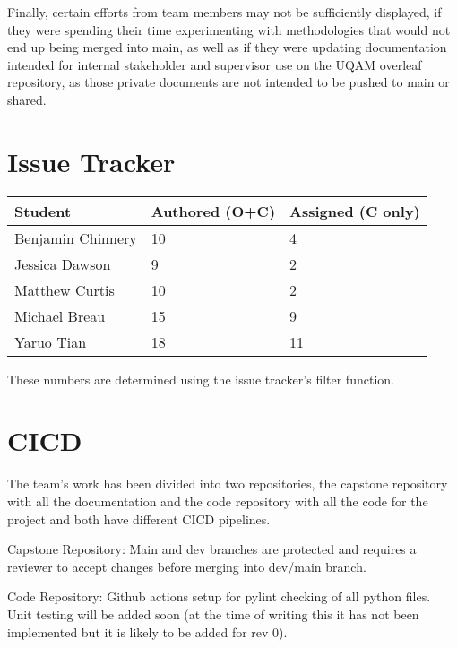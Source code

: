 \documentclass{article}
\begin{document}
Finally, certain efforts from team members may not be sufficiently displayed, if they were spending their time experimenting with methodologies that would not end up being merged into main, as well as if they were updating documentation intended for internal stakeholder and supervisor use on the UQAM overleaf repository, as those private documents are not intended to be pushed to main or shared.



\section{Issue Tracker}

\begin{table}[H]
\centering
\begin{tabular}{lll}
\toprule
\textbf{Student} & \textbf{Authored (O+C)} & \textbf{Assigned (C only)}\\
\midrule
Benjamin Chinnery & 10 & 4 \\
Jessica Dawson& 9 & 2 \\
Matthew Curtis & 10 & 2 \\
Michael Breau & 15 & 9 \\
Yaruo Tian & 18 & 11 \\
\bottomrule
\end{tabular}
\end{table}

These numbers are determined using the issue tracker's filter function.

\section{CICD}

The team's work has been divided into two repositories, the capstone repository with all the documentation and the code repository with all the code for the project and both have different CICD pipelines.

Capstone Repository: Main and dev branches are protected and requires a reviewer to accept changes before merging into dev/main branch.

Code Repository: Github actions setup for pylint checking of all python files. Unit testing will be added soon (at the time of writing this it has not been implemented but it is likely to be added for rev 0).
\end{document}
